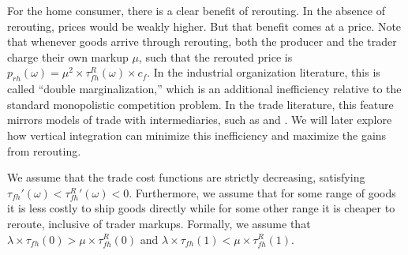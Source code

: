 For the home consumer,  there is a clear benefit of rerouting. In the absence of rerouting, prices would be weakly higher. But that benefit comes at a price. Note that whenever goods arrive through rerouting, both the producer and the trader charge their own markup $\mu$, such that the rerouted price is $p_{rh}(\omega) = \mu^2 \times \tau^R_{fh}(\omega)  \times c_f$. In the industrial organization literature, this is called ``double marginalization,'' which is an additional inefficiency relative to the standard monopolistic competition problem. In the trade literature, this feature mirrors models of trade with intermediaries, such as \citet{crozet_wholesalers_2013} and \citet{ahn_role_2011}. We will later explore how vertical integration can minimize this inefficiency and maximize the gains from rerouting. 


\begin{assumption} \label{ass:single-crossing}  We assume that the trade cost functions are strictly decreasing, satisfying $\tau_{fh}'(\omega) < {\tau^{R}_{fh}}'(\omega) < 0$. Furthermore, we assume that for some range of goods it is less costly to ship goods directly while for some other range it is cheaper to reroute, inclusive of trader markups. Formally, we assume that $\lambda \times \tau_{fh}(0) > \mu \times  \tau^R_{fh}(0)$ and $\lambda \times \tau_{fh}(1) < \mu \times \tau^R_{fh}(1)$.
\end{assumption}

